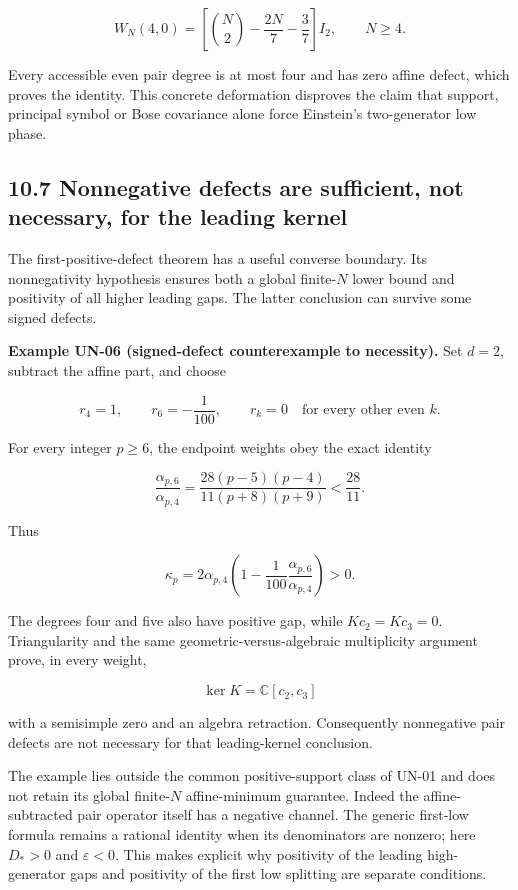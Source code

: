 \[
W_N(4,0)=
\left[\binom N2-\frac{2N}{7}-\frac37\right]I_2,
\qquad N\geq4.
\]

Every accessible even pair degree is at most four and has zero affine defect, which proves the identity. This concrete deformation disproves the claim that support, principal symbol or Bose covariance alone force Einstein's two-generator low phase.

\hypertarget{nonnegative-defects-are-sufficient-not-necessary-for-the-leading-kernel}{%
\subsection{10.7 Nonnegative defects are sufficient, not necessary, for the leading kernel}\label{nonnegative-defects-are-sufficient-not-necessary-for-the-leading-kernel}}

The first-positive-defect theorem has a useful converse boundary. Its nonnegativity hypothesis ensures both a global finite-\(N\) lower bound and positivity of all higher leading gaps. The latter conclusion can survive some signed defects.

\textbf{Example UN-06 (signed-defect counterexample to necessity).} Set \(d=2\), subtract the affine part, and choose

\[
r_4=1,\qquad r_6=-\frac1{100},\qquad
r_k=0\quad\text{for every other even }k.
\]

For every integer \(p\geq6\), the endpoint weights obey the exact identity

\[
\frac{\alpha_{p,6}}{\alpha_{p,4}}
=\frac{28(p-5)(p-4)}{11(p+8)(p+9)}
<\frac{28}{11}.
\]

Thus

\[
\kappa_p=2\alpha_{p,4}
\left(1-\frac1{100}\frac{\alpha_{p,6}}{\alpha_{p,4}}\right)>0.
\]

The degrees four and five also have positive gap, while \(Kc_2=Kc_3=0\). Triangularity and the same geometric-versus-algebraic multiplicity argument prove, in every weight,

\[
\ker K=\mathbb C[c_2,c_3]
\]

with a semisimple zero and an algebra retraction. Consequently nonnegative pair defects are not necessary for that leading-kernel conclusion.

The example lies outside the common positive-support class of UN-01 and does not retain its global finite-\(N\) affine-minimum guarantee. Indeed the affine-subtracted pair operator itself has a negative channel. The generic first-low formula remains a rational identity when its denominators are nonzero; here \(D_*>0\) and \(\varepsilon<0\). This makes explicit why positivity of the leading high-generator gaps and positivity of the first low splitting are separate conditions.

